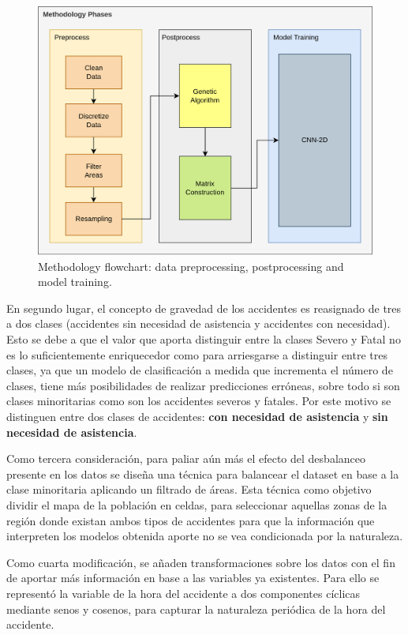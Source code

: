 \documentclass{uathesis-es}
\begin{document}
{	\begin{figure}[H]
		\centering
		\includegraphics[width=14cm]{Figures/7th DataFlow Chart.png}
		\caption{Methodology flowchart: data preprocessing, postprocessing and model training.}
		\label{DataFlow}
	\end{figure}
	
	En segundo lugar, el concepto de gravedad de los accidentes es reasignado de tres a dos clases (accidentes sin necesidad de asistencia y accidentes con necesidad). Esto se debe a que el valor que aporta distinguir entre la clases Severo y Fatal no es lo suficientemente enriquecedor como para arriesgarse a distinguir entre tres clases, ya que un modelo de clasificación a medida que incrementa el número de clases, tiene más posibilidades de realizar predicciones erróneas, sobre todo si son clases minoritarias como son los accidentes severos y fatales. Por este motivo se distinguen entre dos clases de accidentes: \textbf{con necesidad de asistencia} y \textbf{sin necesidad de asistencia}.
	
	Como tercera consideración, para paliar aún más el efecto del desbalanceo presente en los datos se diseña una técnica para balancear el dataset en base a la clase minoritaria aplicando un filtrado de áreas. Esta técnica como objetivo dividir el mapa de la población en celdas, para seleccionar aquellas zonas de la región donde existan ambos tipos de accidentes para que la información que interpreten los modelos obtenida aporte no se vea condicionada por la naturaleza.
	
	Como cuarta modificación, se añaden transformaciones sobre los datos con el fin de aportar más información en base a las variables ya existentes. Para ello se representó la variable de la hora del accidente a dos componentes cíclicas mediante senos y cosenos, para capturar la naturaleza periódica de la hora del accidente.
	
}
\end{document}
